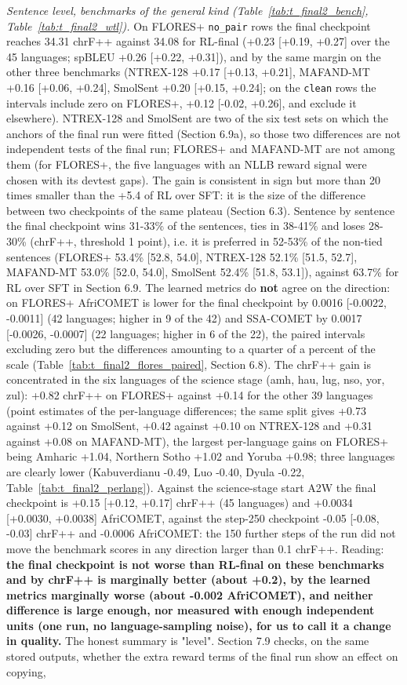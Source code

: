 \emph{Sentence level, benchmarks of the general kind (Table~\ref{tab:t_final2_bench}, Table~\ref{tab:t_final2_wtl}).} On FLORES+ \texttt{no\_pair} rows the final checkpoint reaches 34.31 chrF++ against 34.08 for RL-final (+0.23 {[}+0.19, +0.27{]} over the 45 languages; spBLEU +0.26 {[}+0.22, +0.31{]}), and by the same margin on the other three benchmarks (NTREX-128 +0.17 {[}+0.13, +0.21{]}, MAFAND-MT +0.16 {[}+0.06, +0.24{]}, SmolSent +0.20 {[}+0.15, +0.24{]}; on the \texttt{clean} rows the intervals include zero on FLORES+, +0.12 {[}-0.02, +0.26{]}, and exclude it elsewhere). NTREX-128 and SmolSent are two of the six test sets on which the anchors of the final run were fitted (Section 6.9a), so those two differences are not independent tests of the final run; FLORES+ and MAFAND-MT are not among them (for FLORES+, the five languages with an NLLB reward signal were chosen with its devtest gaps). The gain is consistent in sign but more than 20 times smaller than the +5.4 of RL over SFT: it is the size of the difference between two checkpoints of the same plateau (Section 6.3). Sentence by sentence the final checkpoint wins 31-33\% of the sentences, ties in 38-41\% and loses 28-30\% (chrF++, threshold 1 point), i.e. it is preferred in 52-53\% of the non-tied sentences (FLORES+ 53.4\% {[}52.8, 54.0{]}, NTREX-128 52.1\% {[}51.5, 52.7{]}, MAFAND-MT 53.0\% {[}52.0, 54.0{]}, SmolSent 52.4\% {[}51.8, 53.1{]}), against 63.7\% for RL over SFT in Section 6.9. The learned metrics do \textbf{not} agree on the direction: on FLORES+ AfriCOMET is lower for the final checkpoint by 0.0016 {[}-0.0022, -0.0011{]} (42 languages; higher in 9 of the 42) and SSA-COMET by 0.0017 {[}-0.0026, -0.0007{]} (22 languages; higher in 6 of the 22), the paired intervals excluding zero but the differences amounting to a quarter of a percent of the scale (Table~\ref{tab:t_final2_flores_paired}, Section 6.8). The chrF++ gain is concentrated in the six languages of the science stage (amh, hau, lug, nso, yor, zul): +0.82 chrF++ on FLORES+ against +0.14 for the other 39 languages (point estimates of the per-language differences; the same split gives +0.73 against +0.12 on SmolSent, +0.42 against +0.10 on NTREX-128 and +0.31 against +0.08 on MAFAND-MT), the largest per-language gains on FLORES+ being Amharic +1.04, Northern Sotho +1.02 and Yoruba +0.98; three languages are clearly lower (Kabuverdianu -0.49, Luo -0.40, Dyula -0.22, Table~\ref{tab:t_final2_perlang}). Against the science-stage start A2W the final checkpoint is +0.15 {[}+0.12, +0.17{]} chrF++ (45 languages) and +0.0034 {[}+0.0030, +0.0038{]} AfriCOMET, against the step-250 checkpoint -0.05 {[}-0.08, -0.03{]} chrF++ and -0.0006 AfriCOMET: the 150 further steps of the run did not move the benchmark scores in any direction larger than 0.1 chrF++. Reading: \textbf{the final checkpoint is not worse than RL-final on these benchmarks and by chrF++ is marginally better (about +0.2), by the learned metrics marginally worse (about -0.002 AfriCOMET), and neither difference is large enough, nor measured with enough independent units (one run, no language-sampling noise), for us to call it a change in quality.} The honest summary is "level". Section 7.9 checks, on the same stored outputs, whether the extra reward terms of the final run show an effect on copying, 